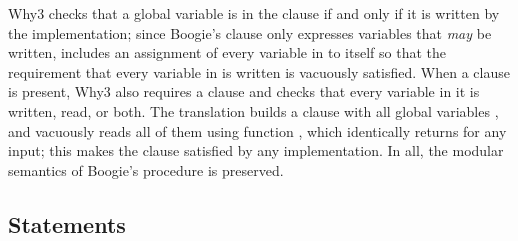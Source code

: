 \documentclass[a4paper,final]{llncs}
\makeatletter
\newif\iflong
\newcommand{\Boogie}{Boogie\xspace}
\newcommand{\WhyML}{WhyML\xspace}
\newcommand{\Why}{Why3\xspace}
\newcommand{\tightParagraph}[1]{\paragraph{#1}}
\newcommand\tightParagraph{\@startsection{paragraph}{4}{\z@}{-5\p@ \@plus -4\p@ \@minus -4\p@}{-0.5em \@plus -0.22em \@minus -0.1em}{\normalfont\normalsize\itshape}}
\newcommand{\feature}[1]{\subsection{#1}}
\makeatother
\begin{document}
\Why checks that a global variable is in the  clause if and only if it is written by the implementation; since \Boogie's  clause only expresses variables that \emph{may} be written,  includes an assignment of every variable in  to itself so that the requirement that every variable in  is written is vacuously satisfied.
When a  clause is present, \Why also requires a  clause and checks that every variable in it is written, read, or both.
The translation builds a  clause with all global variables , and vacuously reads all of them using function , which identically returns  for any input; this makes the  clause satisfied by any implementation.
\fi
In all, the modular semantics of \Boogie's procedure  is preserved.



\feature{Statements}
\label{sec:statements}

\iflong
\tightParagraph{Axioms and assertions.}
\Boogie's \B{assert e}, \B{assume e}, and \B{axiom e} statements translate to 
, 
, and 

in \WhyML.
\fi
\end{document}
